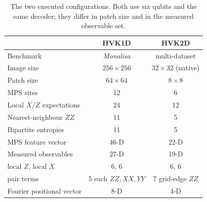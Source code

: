 \documentclass[pdflatex,sn-basic]{sn-jnl}
\begin{document}
\begin{table}[t]
	\centering
	\caption{The two executed configurations. Both use six qubits and the same
		decoder; they differ in patch size and in the measured observable set.}
	\label{tab:configurations}
	\begin{tabular}{@{}l c c@{}}
		\toprule
		& HVK1D                 & HVK2D                  \\
		\midrule
		Benchmark                     & \textit{Monalisa}     & multi-dataset          \\
		Image size                    & $256\times256$        & $32\times32$ (native)  \\
		Patch size                    & $64\times64$          & $8\times8$             \\
		MPS sites                     & 12                    & 6                      \\
		Local $X/Z$ expectations      & 24                    & 12                     \\
		Nearest-neighbour $ZZ$        & 11                    & 5                      \\
		Bipartite entropies           & 11                    & 5                      \\
		MPS feature vector            & 46-D                  & 22-D                   \\
		\midrule
		Measured observables          & 27-D                  & 19-D                   \\
		\quad local $Z$, local $X$    & 6, 6                  & 6, 6                   \\
		\quad pair terms              & 5 each $ZZ,XX,YY$     & 7 grid-edge $ZZ$       \\
		Fourier positional vector     & 8-D                   & 4-D                    \\
		\bottomrule
	\end{tabular}
\end{table}
\end{document}
